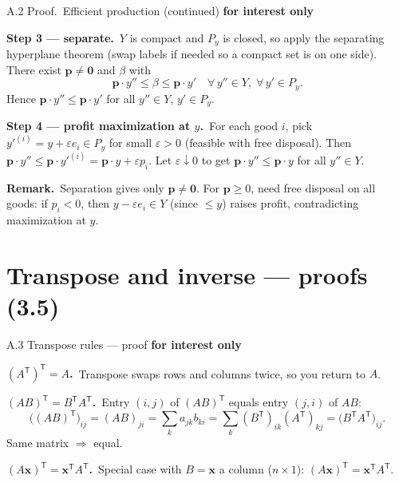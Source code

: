 \documentclass[11pt,aspectratio=169]{beamer}
\newcommand{\InterestOnly}{\textcolor{mAccent}{\textbf{for interest only}}}
\begin{document}
\begin{frame}{A.2 Proof.\ Efficient production (continued)}
  \footnotesize
  \InterestOnly

  \medskip
  \textbf{Step 3 --- separate.}\
  $Y$ is compact and $P_y$ is closed, so apply the separating hyperplane theorem
  (swap labels if needed so a compact set is on one side).
  There exist $\mathbf{p}\neq\mathbf{0}$ and $\beta$ with
  \[
    \mathbf{p}\cdot y''\le\beta\le\mathbf{p}\cdot y'
    \quad\forall\,y''\in Y,\;\forall\,y'\in P_y.
  \]
  Hence $\mathbf{p}\cdot y''\le\mathbf{p}\cdot y'$ for all $y''\in Y$, $y'\in P_y$.

  \medskip
  \textbf{Step 4 --- profit maximization at $y$.}\
  For each good $i$, pick $y'^{(i)}=y+\varepsilon e_i\in P_y$ for small $\varepsilon>0$
  (feasible with free disposal). Then
  $\mathbf{p}\cdot y''\le\mathbf{p}\cdot y'^{(i)}=\mathbf{p}\cdot y+\varepsilon p_i$.
  Let $\varepsilon\downarrow 0$ to get $\mathbf{p}\cdot y''\le\mathbf{p}\cdot y$ for all $y''\in Y$.

  \medskip
  \textbf{Remark.}\
  Separation gives only $\mathbf{p}\neq\mathbf{0}$.
  For $\mathbf{p}\ge 0$, need free disposal on all goods: if $p_i<0$, then
  $y-\varepsilon e_i\in Y$ (since $\le y$) raises profit, contradicting maximization at $y$.
\end{frame}

\section{Transpose and inverse --- proofs (3.5)}

\begin{frame}{A.3 Transpose rules --- proof}
  \hypertarget{sec:transpose-inverse-proofs}{}
  \footnotesize
  \InterestOnly

  \medskip
  \textbf{$(A^{\mathsf T})^{\mathsf T}=A$.}\
  Transpose swaps rows and columns twice, so you return to $A$.

  \medskip
  \textbf{$(AB)^{\mathsf T}=B^{\mathsf T}A^{\mathsf T}$.}\
  Entry $(i,j)$ of $(AB)^{\mathsf T}$ equals entry $(j,i)$ of $AB$:
  \[
    \bigl((AB)^{\mathsf T}\bigr)_{ij}=(AB)_{ji}=\sum_k a_{jk}b_{ki}
    =\sum_k (B^{\mathsf T})_{ik}(A^{\mathsf T})_{kj}
    =\bigl(B^{\mathsf T}A^{\mathsf T}\bigr)_{ij}.
  \]
  Same matrix $\Rightarrow$ equal.

  \medskip
  \textbf{$(A\mathbf{x})^{\mathsf T}=\mathbf{x}^{\mathsf T}A^{\mathsf T}$.}\
  Special case with $B=\mathbf{x}$ a column ($n\times 1$): $(A\mathbf{x})^{\mathsf T}=\mathbf{x}^{\mathsf T}A^{\mathsf T}$.
\end{frame}
\end{document}
